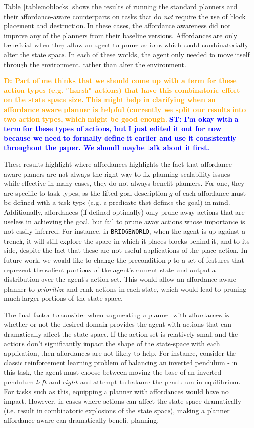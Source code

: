 \documentclass[]{article}
\newcommand{\stnote}[1]{\textcolor{Blue}{\textbf{ST: #1}}}
\newcommand{\dnote}[1]{\textcolor{Orange}{\textbf{D: #1}}}
\begin{document}
Table~\ref{table:noblocks} shows the results of running the standard
planners and their affordance-aware counterparts on tasks that do {\it
  not} require the use of block placement and destruction.  In these
cases, the affordance awareness did not improve any of the planners
from their baseline versions. Affordances are only beneficial when
they allow an agent to prune actions which could combinatorially alter
the state space. In each of these worlds, the agent only needed to
move itself through the environment, rather than alter the
environment.  

\dnote{Part of me thinks that we should come up with a term for these
  action types (e.g. ``harsh" actions) that have this combinatoric
  effect on the state space size. This might help in clarifying when
  an affordance aware planner is helpful (currently we split our
  results into two action types, which might be good enough.  }
\stnote{I'm okay with a term for these types of actions, but I just
  edited it out for now because we need to formally define it earlier
  and use it consistently throughout the paper.  We shoudl maybe talk
  about it first.}


These results highlight where affordances highlights the fact that affordance aware planers are
not always the right way to fix planning scalability issues - while
effective in many cases, they do not always benefit planners. For one,
they are specific to task types, as the lifted goal description $g$ of
each affordance must be defined with a task type (e.g. a predicate
that defines the goal) in mind. Additionally, affordances (if defined
optimally) only prune away actions that are useless in achieving the
goal, but fail to prune away actions whose importance is not easily
inferred. For instance, in \texttt{BRIDGEWORLD}, when the agent is up
against a trench, it will still explore the space in which it places
blocks behind it, and to its side, despite the fact that these are not
useful applications of the place action. In future work, we would like
to change the precondition $p$ to a set of features that represent the
salient portions of the agent's current state and output a
distribution over the agent's action set. This would allow an
affordance aware planner to {\it prioritize} and rank actions in each
state, which would lead to pruning much larger portions of the
state-space.


The final factor to consider when augmenting a planner with affordances is whether or not the desired domain provides
the agent with actions that can dramatically affect the state space. If the action set is relatively small and the actions
don't significantly impact the shape of the state-space with each application, then affordances are not likely to help. For instance, consider the classic reinforcement learning problem of balancing an inverted pendulum - in this task, the agent must choose between moving the base of an inverted pendulum $left$ and $right$ and attempt to balance the pendulum in equilibrium. For tasks such as this, equipping a planner with affordances would have no impact. However, in cases where actions can affect the state-space dramatically (i.e. result in combinatoric explosions of the state space), making a planner affordance-aware can dramatically benefit planning.
\end{document}
